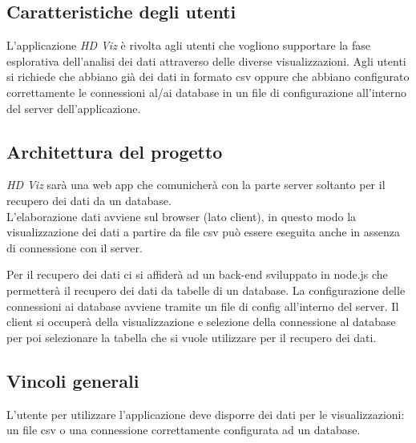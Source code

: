\subsection{Caratteristiche degli utenti}
L'applicazione \emph{HD Viz} è rivolta agli utenti che vogliono supportare la fase esplorativa dell'analisi dei dati attraverso delle diverse visualizzazioni. Agli utenti si richiede che abbiano già dei dati in formato csv oppure che abbiano configurato correttamente le connessioni al/ai database in un file di configurazione all'interno del server dell'applicazione.


\subsection{Architettura del progetto}
\emph{HD Viz} sarà una web app che comunicherà con la parte server soltanto per il recupero dei dati da un database.
\\
L'elaborazione dati avviene sul browser (lato client), in questo modo la visualizzazione dei dati a partire da file csv può essere eseguita anche in assenza di connessione con il server.

Per il recupero dei dati ci si affiderà ad un back-end sviluppato in node.js che permetterà il recupero dei dati da tabelle di un database. La configurazione delle connessioni ai database avviene tramite un file di config all'interno del server. Il client si occuperà della visualizzazione e selezione della connessione al database per poi selezionare la tabella che si vuole utilizzare per il recupero dei dati.

\subsection{Vincoli generali}
L'utente per utilizzare l'applicazione deve disporre dei dati per le visualizzazioni: un file csv o una connessione correttamente configurata ad un database.
